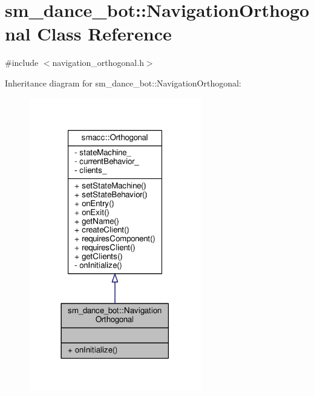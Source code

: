 \hypertarget{classsm__dance__bot_1_1NavigationOrthogonal}{}\section{sm\+\_\+dance\+\_\+bot\+:\+:Navigation\+Orthogonal Class Reference}
\label{classsm__dance__bot_1_1NavigationOrthogonal}


{\ttfamily \#include $<$navigation\+\_\+orthogonal.\+h$>$}



Inheritance diagram for sm\+\_\+dance\+\_\+bot\+:\+:Navigation\+Orthogonal\+:
\nopagebreak
\begin{figure}[H]
\begin{center}
\leavevmode
\includegraphics[width=213pt]{classsm__dance__bot_1_1NavigationOrthogonal__inherit__graph}
\end{center}
\end{figure}


